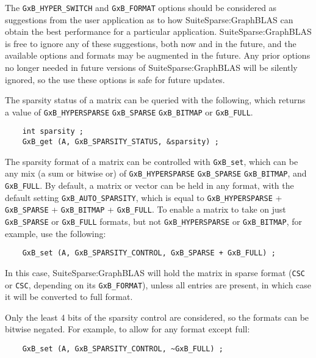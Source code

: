 \documentclass[12pt]{article}
\begin{document}
{The \verb'GxB_HYPER_SWITCH' and \verb'GxB_FORMAT' options should be considered as
suggestions from the user application as to how SuiteSparse:GraphBLAS can
obtain the best performance for a particular application.
SuiteSparse:GraphBLAS is free to ignore any of these suggestions, both now and
in the future, and the available options and formats may be augmented in the
future.  Any prior options no longer needed in future versions of
SuiteSparse:GraphBLAS will be silently ignored, so the use these options is
safe for future updates.

The sparsity status of a matrix can be queried with the following, which
returns a value of \verb'GxB_HYPERSPARSE' \verb'GxB_SPARSE' \verb'GxB_BITMAP'
or \verb'GxB_FULL'.

{\footnotesize
\begin{verbatim}
    int sparsity ;
    GxB_get (A, GxB_SPARSITY_STATUS, &sparsity) ; \end{verbatim}}

The sparsity format of a matrix can be controlled with \verb'GxB_set', which
can be any mix (a sum or bitwise or) of \verb'GxB_HYPERSPARSE'
\verb'GxB_SPARSE' \verb'GxB_BITMAP', and \verb'GxB_FULL'.  By default, a matrix
or vector can be held in any format, with the default setting
\verb'GxB_AUTO_SPARSITY', which is equal to \verb'GxB_HYPERSPARSE' +
\verb'GxB_SPARSE' + \verb'GxB_BITMAP' + \verb'GxB_FULL'.  To enable a matrix to
take on just \verb'GxB_SPARSE' or \verb'GxB_FULL' formats, but not
\verb'GxB_HYPERSPARSE' or \verb'GxB_BITMAP', for example, use the following:

{\footnotesize
\begin{verbatim}
    GxB_set (A, GxB_SPARSITY_CONTROL, GxB_SPARSE + GxB_FULL) ; \end{verbatim}}

In this case, SuiteSparse:GraphBLAS will hold the matrix in sparse format
(\verb'CSC' or \verb'CSC', depending on its \verb'GxB_FORMAT'), unless all
entries are present, in which case it will be converted to full format.

Only the least 4 bits of the sparsity control are considered, so the
formats can be bitwise negated.  For example, to allow for any format
except full:

{\footnotesize
\begin{verbatim}
    GxB_set (A, GxB_SPARSITY_CONTROL, ~GxB_FULL) ; \end{verbatim}}

}
\end{document}
